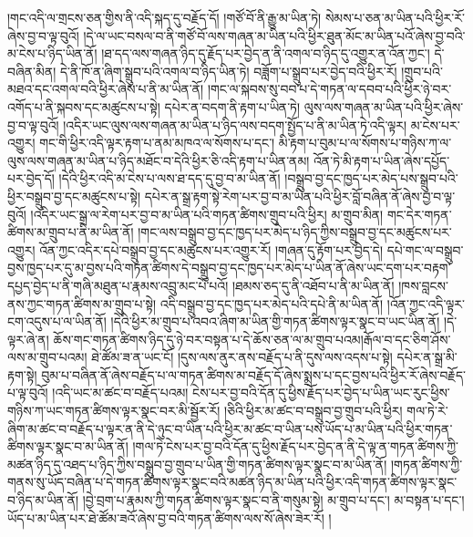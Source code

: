།གང་འདི་ལ་གྲངས་ཅན་གྱིས་ནི་འདི་སྐད་དུ་བརྗོད་དོ། །གཙོ་བོ་ནི་རྒྱུ་མ་ཡིན་ཏེ། སེམས་པ་ཅན་མ་ཡིན་པའི་ཕྱིར་རོ་ཞེས་བྱ་བ་ལྟ་བུའོ། །དེ་ལ་ཡང་བསལ་བ་ནི་གཙོ་བོ་ལས་གཞན་མ་ཡིན་པའི་ཕྱིར་ཐུན་མོང་མ་ཡིན་པའོ་ཞེས་བྱ་བའི་མ་ངེས་པ་ཉིད་ཡིན་ནོ། །ཐ་དད་ལས་གཞན་ཉིད་དུ་རྗོད་པར་བྱེད་ན་ནི་འགལ་བ་ཉིད་དུ་འགྱུར་ན་འོན་ཀྱང་། དེ་བཞིན་མིན། དེ་ནི་ཁོ་ན་ཞིག་སྒྲུབ་པའི་འགལ་བ་ཉིད་ཡིན་ཏེ། བཟློག་པ་སྒྲུབ་པར་བྱེད་བའི་ཕྱིར་རོ། །གྲུབ་པའི་མཐའ་དང་འགལ་བའི་ཕྱིར་ཞེས་པ་ནི་མ་ཡིན་ནོ། །གང་ལ་སྐབས་སུ་བབ་པ་དེ་གཏན་ལ་དབབ་པའི་ཕྱིར་ཉེ་བར་འགོད་པ་ནི་སྐབས་དང་མཚུངས་པ་སྟེ། དཔེར་ན་བདག་ནི་རྟག་པ་ཡིན་ཏེ། ལུས་ལས་གཞན་མ་ཡིན་པའི་ཕྱིར་ཞེས་བྱ་བ་ལྟ་བུའོ། །འདིར་ཡང་ལུས་ལས་གཞན་མ་ཡིན་པ་ཉིད་ལས་བདག་སྤྱོད་པ་ནི་མ་ཡིན་ཏེ་འདི་ལྟར། མ་ངེས་པར་འགྱུར། གང་གི་ཕྱིར་འདི་ལྟར་རྟག་པ་ནམ་མཁའ་ལ་སོགས་པ་དང་། མི་རྟག་པ་བུམ་པ་ལ་སོགས་པ་གཉིས་ཀ་ལ་ལུས་ལས་གཞན་མ་ཡིན་པ་ཉིད་མཐོང་བ་དེའི་ཕྱིར་ཅི་འདི་རྟག་པ་ཡིན་ནམ། འོན་ཏེ་མི་རྟག་པ་ཡིན་ཞེས་དཔྱོད་པར་བྱེད་དོ། །དེའི་ཕྱིར་འདི་མ་ངེས་པ་ལས་ཐ་དད་དུ་བྱ་བ་མ་ཡིན་ནོ། །བསྒྲུབ་བྱ་དང་ཁྱད་པར་མེད་པས་སྒྲུབ་པའི་ཕྱིར་བསྒྲུབ་བྱ་དང་མཚུངས་པ་སྟེ། དཔེར་ན་སྒྲ་རྟག་སྟེ་རེག་པར་བྱ་བ་མ་ཡིན་པའི་ཕྱིར་བློ་བཞིན་ནོ་ཞེས་བྱ་བ་ལྟ་བུའོ། །འདིར་ཡང་སྒྲ་ལ་རེག་པར་བྱ་བ་མ་ཡིན་པའི་གཏན་ཚིགས་གྲུབ་པའི་ཕྱིར། མ་གྲུབ་མིན། གང་དེར་གཏན་ཚིགས་མ་གྲུབ་པ་ནི་མ་ཡིན་ནོ། །གང་ལས་བསྒྲུབ་བྱ་དང་ཁྱད་པར་མེད་པ་ཉིད་ཀྱིས་བསྒྲུབ་བྱ་དང་མཚུངས་པར་འགྱུར། འོན་ཀྱང་འདིར་དཔེ་བསྒྲུབ་བྱ་དང་མཚུངས་པར་འགྱུར་རོ། །གཞན་དུ་རྟོག་པར་བྱེད་དེ། དཔེ་གང་ལ་བསྒྲུབ་བྱས་ཁྱད་པར་དུ་མ་བྱས་པའི་གཏན་ཚིགས་དེ་བསྒྲུབ་བྱ་དང་ཁྱད་པར་མེད་པ་ཡིན་ནོ་ཞེས་ཡང་དག་པར་བརྟག་དཔྱད་བྱེད་པ་ནི་གཞི་མཐུན་པ་རྣམས་འབྲུ་མང་པོ་པའོ། །ཐམས་ཅད་དུ་ནི་འཐོབ་པ་ནི་མ་ཡིན་ནོ། །ཁས་བླངས་ནས་ཀྱང་གཏན་ཚིགས་མ་གྲུབ་པ་སྟེ། འདི་བསྒྲུབ་བྱ་དང་ཁྱད་པར་མེད་པའི་དཔེ་ནི་མ་ཡིན་ནོ། །འོན་ཀྱང་འདི་ལྟར་ངག་འདུས་པ་ལ་ཡིན་ནོ། །དེའི་ཕྱིར་མ་གྲུབ་པ་འབའ་ཞིག་མ་ཡིན་གྱི་གཏན་ཚིགས་ལྟར་སྣང་བ་ཡང་ཡིན་ནོ། །དེ་ལྟར་ཞེ་ན། ཆོས་གང་གཏན་ཚིགས་ཉིད་དུ་ཉེ་བར་བསྟན་པ་དེ་ཆོས་ཅན་ལ་མ་གྲུབ་པའམ།རྒོལ་བ་དང་ཅིག་ཤོས་ལས་མ་གྲུབ་པའམ། ཐེ་ཚོམ་ཟ་ན་ཡང་ངོ། །དུས་ལས་ནུར་ནས་བརྗོད་པ་ནི་དུས་ལས་འདས་པ་སྟེ། དཔེར་ན་སྒྲ་མི་རྟག་སྟེ། བུམ་པ་བཞིན་ནོ་ཞེས་བརྗོད་པ་ལ་གཏན་ཚིགས་མ་བརྗོད་དོ་ཞེས་སྨྲས་པ་དང་བྱས་པའི་ཕྱིར་རོ་ཞེས་བརྗོད་པ་ལྟ་བུའོ། །འདི་ཡང་མ་ཚང་བ་བརྗོད་པའམ། ངེས་པར་བྱ་བའི་དོན་དུ་ཕྱིས་རྗོད་པར་བྱེད་པ་ཡིན་ཡང་རུང་ཕྱིས་གཉིས་ཀ་ཡང་གཏན་ཚིགས་ལྟར་སྣང་བར་མི་སྦྱོར་རོ། །ཅིའི་ཕྱིར་མ་ཚང་བ་བསྒྲུབ་བྱ་གྲུབ་པའི་ཕྱིར། གལ་ཏེ་རེ་ཞིག་མ་ཚང་བ་བརྗོད་པ་ལྟར་ན་ནི་དེ་ཉུང་བ་ཡིན་པའི་ཕྱིར་མ་ཚང་བ་ཡིན་པས་ཡོད་པ་མ་ཡིན་པའི་ཕྱིར་གཏན་ཚིགས་ལྟར་སྣང་བ་མ་ཡིན་ནོ། །གལ་ཏེ་ངེས་པར་བྱ་བའི་དོན་དུ་ཕྱིས་རྗོད་པར་བྱེད་ན་ནི་དེ་ལྟ་ན་གཏན་ཚིགས་ཀྱི་མཚན་ཉིད་དུ་འཐད་པ་ཉིད་ཀྱིས་བསྒྲུབ་བྱ་གྲུབ་པ་ཡིན་གྱི་གཏན་ཚིགས་ལྟར་སྣང་བ་མ་ཡིན་ནོ། །གཏན་ཚིགས་ཀྱི་གནས་སུ་ཡོད་བཞིན་པ་དེ་གཏན་ཚིགས་ལྟར་སྣང་བའི་མཚན་ཉིད་མ་ཡིན་པའི་ཕྱིར་འདི་གཏན་ཚིགས་ལྟར་སྣང་བ་ཉིད་མ་ཡིན་ནོ། །བྱེ་བྲག་པ་རྣམས་ཀྱི་གཏན་ཚིགས་ལྟར་སྣང་བ་ནི་གསུམ་སྟེ། མ་གྲུབ་པ་དང་། མ་བསྟན་པ་དང་། ཡོད་པ་མ་ཡིན་པར་ཐེ་ཚོམ་ཟའོ་ཞེས་བྱ་བའི་གཏན་ཚིགས་ལས་སོ་ཞེས་ཟེར་རོ། །
